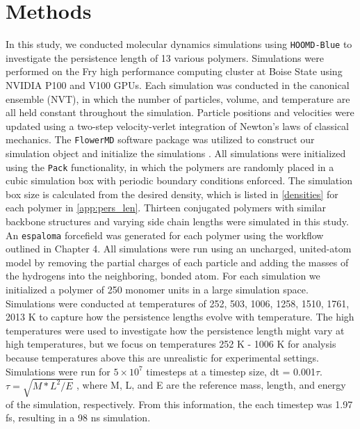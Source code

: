 \section{Methods}
In this study, we conducted molecular dynamics simulations using \texttt{HOOMD-Blue} to investigate the persistence length of 13 various polymers. Simulations were performed on the Fry high performance computing cluster at Boise State using NVIDIA P100 and V100 GPUs. Each simulation was conducted in the canonical ensemble (NVT), in which the number of particles, volume, and temperature are all held constant throughout the simulation. Particle positions and velocities were updated using a two-step velocity-verlet integration of Newton’s laws of classical mechanics. The \texttt{FlowerMD} software package was utilized to construct our simulation object and initialize the simulations \citep{Albooyeh2023}. All simulations were initialized using the \texttt{Pack} functionality, in which the polymers are randomly placed in a cubic simulation box with periodic boundary conditions enforced. The simulation box size is calculated from the desired density, which is listed in \autoref{densities} for each polymer in \autoref{app:pers_len}. Thirteen conjugated polymers with similar backbone structures and varying side chain lengths were simulated in this study. An \texttt{espaloma} forcefield was generated for each polymer using the workflow outlined in Chapter 4. All simulations were run using an uncharged, united-atom model by removing the partial charges of each particle and adding the masses of the hydrogens into the neighboring, bonded atom. For each simulation we initialized a polymer of 250 monomer units in a large simulation space. Simulations were conducted at temperatures of
252, 503, 1006, 1258, 1510, 1761, 2013 K to capture how the persistence lengths evolve with temperature. The high temperatures were used to investigate how the persistence length might vary at high temperatures, but we focus on temperatures 252 K - 1006 K for analysis because temperatures above this are unrealistic for experimental settings. Simulations were run for $5 \times 10^7$ timesteps at a timestep size, dt = 0.001$\tau$. $\tau = \sqrt{M*L^2/E}$ , where M, L, and E are the reference mass, length, and energy of the simulation, respectively. From this information, the each timestep was 1.97 fs, resulting in a 98 ns simulation. 

